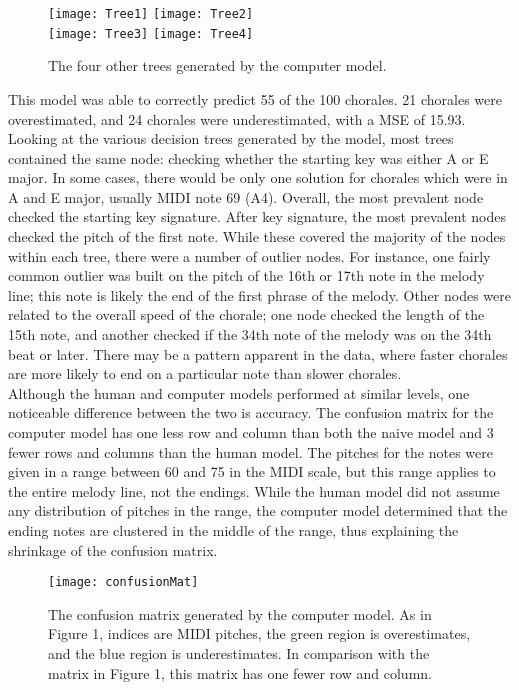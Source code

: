 \documentclass[12pt]{article}
\begin{document}
\begin{figure}[h]
  \centering
  \texttt{[image: Tree1]}
  \texttt{[image: Tree2]}\\
  \centering
  \texttt{[image: Tree3]}
  \texttt{[image: Tree4]}
  \caption{The four other trees generated by the computer model. }
\end{figure}

This model was able to correctly predict 55 of the 100 chorales. 21 chorales were overestimated, and 24 chorales were underestimated, with a MSE of 15.93. Looking at the various decision trees generated by the model, most trees contained the same node: checking whether the starting key was either A or E major. In some cases, there would be only one solution for chorales which were in A and E major, usually MIDI note 69 (A4). Overall, the most prevalent node checked the starting key signature. After key signature, the most prevalent nodes checked the pitch of the first note. While these covered the majority of the nodes within each tree, there were a number of outlier nodes. For instance, one fairly common outlier was built on the pitch of the 16th or 17th note in the melody line; this note is likely the end of the first phrase of the melody. Other nodes were related to the overall speed of the chorale; one node checked the length of the 15th note, and another checked if the 34th note of the melody was on the 34th beat or later. There may be a pattern apparent in the data, where faster chorales are more likely to end on a particular note than slower chorales.\\

Although the human and computer models performed at similar levels, one noticeable difference between the two is accuracy. The confusion matrix for the computer model has one less row and column than both the naive model and 3 fewer rows and columns than the human model. The pitches for the notes were given in a range between 60 and 75 in the MIDI scale, but this range applies to the entire melody line, not the endings. While the human model did not assume any distribution of pitches in the range, the computer model determined that the ending notes are clustered in the middle of the range, thus explaining the shrinkage of the confusion matrix.\\

\begin{figure}[h]
  \texttt{[image: confusionMat]}
  \centering
  \caption{The confusion matrix generated by the computer model. As in Figure 1, indices are MIDI pitches, the green region is overestimates, and the blue region is underestimates. In comparison with the matrix in Figure 1, this matrix has one fewer row and column.}
\end{figure}
\end{document}
